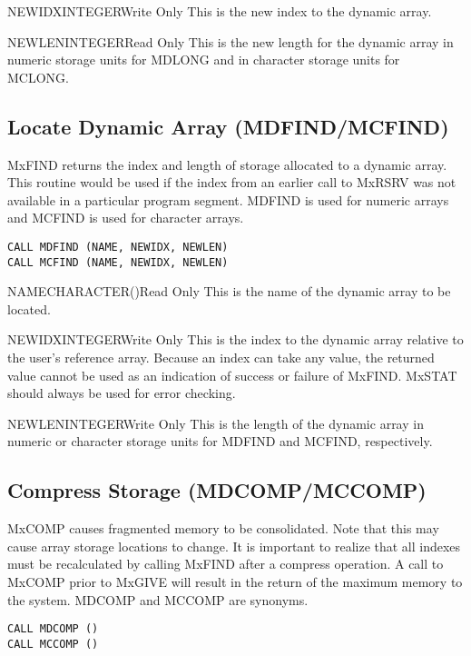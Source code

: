 \begin{argy}{NEWIDX}{INTEGER}{Write Only}
This is the new index to the dynamic array.
\end{argy}

\begin{argy}{NEWLEN}{INTEGER}{Read Only}
This is the new length for the dynamic array in numeric storage units for
MDLONG and in character storage units for MCLONG.
\end{argy}

\subsection{Locate Dynamic Array (MDFIND/MCFIND)}
MxFIND
returns the index and length of storage allocated to a dynamic
array.  This routine would be used if the index from an earlier call to
MxRSRV was not available in a particular program segment. MDFIND
is used for numeric arrays and MCFIND is used for character arrays.
\begin{verbatim}
CALL MDFIND (NAME, NEWIDX, NEWLEN)
CALL MCFIND (NAME, NEWIDX, NEWLEN)
\end{verbatim}

\begin{argy}{NAME}{CHARACTER\last(\last)}{Read Only}
This is the name of the dynamic array to be located.
\end{argy}

\begin{argy}{NEWIDX}{INTEGER}{Write Only}
This is the index to the dynamic array relative to the user's reference
array. Because an index can take any value, the returned value cannot be
used as an indication of success or failure of MxFIND. MxSTAT should always
be used for error checking.
\end{argy}

\begin{argy}{NEWLEN}{INTEGER}{Write Only}
This is the length of the dynamic array in numeric or character storage
units for MDFIND and MCFIND, respectively.
\end{argy}

\subsection{Compress Storage (MDCOMP/MCCOMP)}
MxCOMP causes fragmented memory to be consolidated.  Note that
this may cause array storage locations to change.  It is important to
realize that all indexes must be recalculated by calling MxFIND
after a compress operation.  A call to MxCOMP prior to
MxGIVE will result in the return of the maximum memory to the system.
MDCOMP and MCCOMP are synonyms.
\begin{verbatim}
CALL MDCOMP ()
CALL MCCOMP ()
\end{verbatim}

